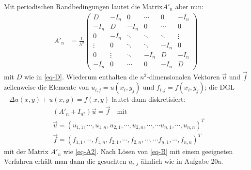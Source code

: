 Mit periodischen Randbedingungen lautet die Matrix$A'_n$ aber nun:
\begin{align}
\label{eq-A2}
A'_n&=\frac{1}{h^2} \begin{pmatrix}
D & -I_n & 0 & \cdots & 0 & -I_n\\
-I_n & D & -I_n & 0 & \cdots & 0\\
0 & -I_n& \ddots & \ddots & \ddots &\vdots\\
\vdots & 0 & \ddots& \ddots & -I_n & 0\\
0 & \vdots & \ddots & -I_n & D & -I_n\\
-I_n & 0 & \cdots & 0 & -I_n & D
\end{pmatrix}
\end{align}
mit $D$ wie in \eqref{eq-D}.
Wiederum enthalten die $n^2$-dimensionalen Vektoren $\vec u $ und $\vec f$
zeilenweise die Elemente von $u_{i,j} = u(x_i, y_j)$ und $f_{i, j} = f(x_i, y_j)$;
die DGL $- \Delta u(x,y) + u(x,y) = f(x, y)$ lautet dann diskretisiert:
\begin{align}
\label{eq-B}
& \left(A'_n + I_{n^2} \right) \vec u = \vec f \quad \text{mit} \\
\nonumber
& \vec u = \left(u_{1,1}, \cdots , u_{1,n}, u_{2,1}, \cdots , u_{2,n}, \cdots , \cdots u_{n,1}, \cdots , u_{n,n} \right)^T \\
\nonumber
& \vec f = \left(f_{1,1}, \cdots , f_{1,n}, f_{2,1}, \cdots , f_{2,n}, \cdots , \cdots f_{n,1}, \cdots , f_{n,n} \right)^T
\end{align}
mit der Matrix $A'_n$ wie \eqref{eq-A2}. Nach Lösen von \eqref{eq-B} mit einem
geeigneten Verfahren erhält man dann die gesuchten  $u_{i,j}$ ähnlich wie
in Aufgabe 20a.
